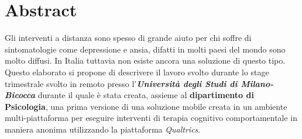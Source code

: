 \documentclass[a4paper, 12pt, oneside]{book}
\makeatletter
\def\cleardoublepage{\clearpage\if@twoside \ifodd\c@page\else
\hbox{}
\vspace*{\fill}
\vspace{\fill}
\thispagestyle{empty}
\newpage
\if@twocolumn\hbox{}\newpage\fi\fi\fi}
\makeatother
\begin{document}
\frontmatter
\pagestyle{plain}



\chapter*{Abstract}
Gli interventi a distanza sono spesso di grande aiuto per chi soffre di sintomatologie come depressione e ansia, difatti in molti paesi del mondo sono molto diffusi. In Italia tuttavia  non esiste ancora una soluzione di questo tipo.\\
Questo elaborato si propone di descrivere il lavoro svolto durante lo stage trimestrale svolto in remoto presso l'\textit{\textbf{Università degli Studi di Milano-Bicocca}} durante il quale è stata creata, assieme al \textbf{dipartimento di Psicologia}, una prima versione di una soluzione mobile creata in un ambiente multi-piattaforma per eseguire interventi di terapia cognitivo comportamentale in maniera anonima utilizzando la piattaforma \textit{Qualtrics}.

\tableofcontents
\listoffigures

\mainmatter
\pagestyle{fancy}







\begin{appendices}

\end{appendices}

\cleardoublepage
{}
{}
\printbibliography
\end{document}
